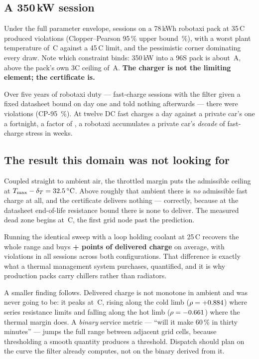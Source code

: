 \documentclass[11pt,letterpaper]{article}
\theoremstyle{definition}
\theoremstyle{remark}
\newcommand{\SI}[2]{#1\,#2}
\newcommand{\degreeCelsius}{\degC}
\newcommand{\degC}{\ifmmode{^\circ}\mathrm{C}\else\textdegree C\fi}
\begin{document}
\subsection{A 350\,kW session}

Under the full parameter envelope, \gFastN{} sessions on a 78\,kWh robotaxi pack at \SI{35}{\degreeCelsius}
produced \gFastViol{} violations (Clopper--Pearson 95\,\% upper bound \gFastCP\,\%), with a worst
plant temperature of \SI{\gFastWorstT}{\degreeCelsius} against a \SI{45}{\degreeCelsius} limit, and the pessimistic
corner dominating every draw. Note which constraint binds: 350\,kW into a 96S pack is about
\gChargerA\,A, above the pack's own 3C ceiling of \gPackCeilA\,A. \textbf{The charger is not the
limiting element; the certificate is.}

Over five years of robotaxi duty --- \gRoboSessions{} fast-charge sessions with the filter given
a fixed datasheet bound on day one and told nothing afterwards --- there were \gRoboViol{}
violations (CP-95 \gRoboCP\,\%). At twelve DC fast charges a day against a private car's one a
fortnight, a factor of \gStressRatio{}, a robotaxi accumulates a private car's \emph{decade} of
fast-charge stress in \gWeeks{} weeks.

\subsection{The result this domain was not looking for}

Coupled straight to ambient air, the throttled margin puts the admissible ceiling at
$T_{\max}-\delta_T = \SI{\gCeiling}{\degreeCelsius}$. Above roughly that ambient there is \emph{no} admissible
fast charge at all, and the certificate delivers nothing --- correctly, because at the datasheet
end-of-life resistance bound there is none to deliver. The measured dead zone begins at
\SI{\gDeadZone}{\degreeCelsius}, the first grid node past the prediction.

Running the identical sweep with a loop holding coolant at \SI{25}{\degreeCelsius} recovers the whole range
and buys \textbf{+\gLoopGain{} points of delivered charge} on average, with \gFastViol{}
violations in all \gAmbTrials{} sessions across both configurations. That difference is exactly
what a thermal management system purchases, quantified, and it is why production packs carry
chillers rather than radiators.

A smaller finding follows. Delivered charge is not monotone in ambient and was never going to
be: it peaks at \SI{\gPeakAmb}{\degreeCelsius}, rising along the cold limb ($\rho = +0.884$) where series
resistance limits and falling along the hot limb ($\rho = -0.661$) where the thermal margin
does. A \emph{binary} service metric --- ``will it make 60\,\% in thirty minutes'' --- jumps the
full range between adjacent grid cells, because thresholding a smooth quantity produces a
threshold. Dispatch should plan on the curve the filter already computes, not on the binary
derived from it.
\end{document}
